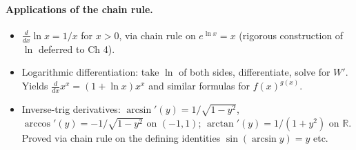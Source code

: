 \paragraph{Applications of the chain rule.}
\begin{itemize}
    \item \(\frac{d}{dx} \ln x = 1/x\) for \(x > 0\), via chain rule on \(e^{\ln x} = x\) (rigorous construction of \(\ln\) deferred to Ch 4).
    \item Logarithmic differentiation: take \(\ln\) of both sides, differentiate, solve for \(W'\). Yields \(\frac{d}{dx} x^{x} = (1 + \ln x) x^{x}\) and similar formulas for \(f(x)^{g(x)}\).
    \item Inverse-trig derivatives: \(\arcsin'(y) = 1/\sqrt{1 - y^{2}}\), \(\arccos'(y) = -1/\sqrt{1 - y^{2}}\) on \((-1, 1)\); \(\arctan'(y) = 1/(1 + y^{2})\) on \(\mathbb{R}\). Proved via chain rule on the defining identities \(\sin(\arcsin y) = y\) etc.
\end{itemize}


